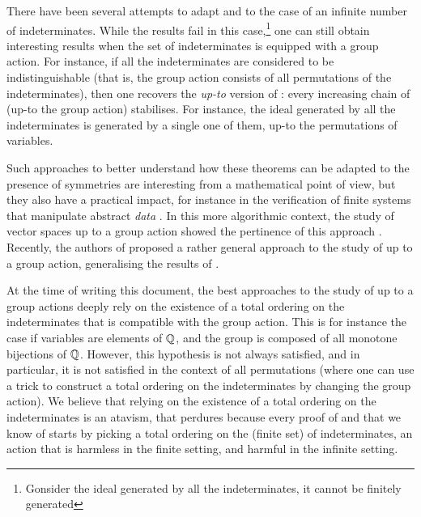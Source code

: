 \AP There have been several attempts to adapt  and
 to the case of an infinite number of
indeterminates. While the results fail in this case,\footnote{Gonsider the
ideal generated by all the indeterminates, it cannot be finitely generated} one
can still obtain interesting results when the set of indeterminates is equipped
with a group action. For instance, if all the indeterminates are considered to
be indistinguishable (that is, the group action consists of all permutations of
the indeterminates), then one recovers the \emph{up-to} version of
 \cite{BRDR11,HIKRLE18}: every increasing chain of
 (up-to the group action) stabilises. For instance, the ideal
generated by all the indeterminates is generated by a single one of them, up-to
the permutations of variables.

\AP Such approaches to better understand how these theorems can be adapted to
the presence of symmetries are interesting from a mathematical point of view,
but they also have a practical impact, for instance in the verification of
finite systems that manipulate abstract \emph{data} \cite{KAFR94}. 
In this more algorithmic context, the study of vector spaces up to a 
group action showed the pertinence of this approach \cite{BOZLMO21}.
Recently, the authors of \cite{GHOLAS24} proposed a rather general 
approach to the study of  up to a group action, generalising
the results of \cite{BRDR11,HIKRLE18}.

\AP At the time of writing this document, the best approaches to the study of
 up to a group actions deeply rely on the existence of a total
ordering on the indeterminates that is compatible with the group action. This
is for instance the case if variables are elements of $\mathbb{Q}$, and the group is
composed of all monotone bijections of $\mathbb{Q}$. However, this hypothesis is not
always satisfied, and in particular, it is not satisfied in the context of all
permutations (where one can use a trick to construct a total ordering on the
indeterminates by changing the group action). We believe that relying on the
existence of a total ordering on the indeterminates is an atavism, that
perdures because every proof of  and
 that we know of starts by picking a total ordering
on the (finite set) of indeterminates, an action that is harmless in the finite
setting, and harmful in the infinite setting.

